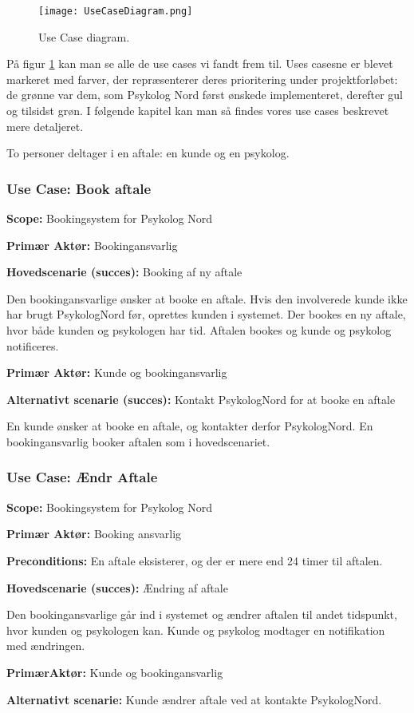 \begin{figure}[p]
	\centering
  		\texttt{[image: UseCaseDiagram.png]}
  \caption{Use Case diagram.}
  \label{fig:UseCaseDiagram}
\end{figure}

På figur \ref{fig:UseCaseDiagram} kan man se alle de use cases vi fandt frem til.
Uses casesne er blevet markeret med farver, der repræsenterer deres prioritering under projektforløbet: de grønne var dem, som Psykolog Nord først ønskede implementeret, derefter gul og tilsidst grøn.
I følgende kapitel kan man så findes vores use cases beskrevet mere detaljeret. 

To personer deltager i en aftale: en kunde og en psykolog.

\subsubsection{Use Case: Book aftale}\label{usecase:bookaftale}
{\setlength{\parindent}{0cm}
\textbf{Scope:} Bookingsystem for Psykolog Nord

\textbf{Primær Aktør:} Bookingansvarlig

\textbf{Hovedscenarie (succes):} Booking af ny aftale

Den bookingansvarlige ønsker at booke en aftale.
Hvis den involverede kunde ikke har brugt PsykologNord før, oprettes kunden i systemet.
Der bookes en ny aftale, hvor både kunden og psykologen har tid. 
Aftalen bookes og kunde og psykolog notificeres.

\textbf{Primær Aktør:} Kunde og bookingansvarlig

\textbf{Alternativt scenarie (succes):} Kontakt PsykologNord for at booke en aftale

En kunde ønsker at booke en aftale, og kontakter derfor PsykologNord.
En bookingansvarlig booker aftalen som i hovedscenariet.
}

\subsubsection{Use Case: Ændr Aftale}
{\setlength{\parindent}{0cm}
\textbf{Scope:} Bookingsystem for Psykolog Nord

\textbf{Primær Aktør:} Booking ansvarlig 

\textbf{Preconditions:} En aftale eksisterer, og der er mere end 24 timer til aftalen.

\textbf{Hovedscenarie (succes):} Ændring af aftale

Den bookingansvarlige går ind i systemet og ændrer aftalen til andet tidspunkt, hvor kunden og psykologen kan.
Kunde og psykolog modtager en notifikation med ændringen.

\textbf{PrimærAktør:} Kunde og bookingansvarlig

\textbf{Alternativt scenarie:} Kunde ændrer aftale ved at kontakte PsykologNord.
}

